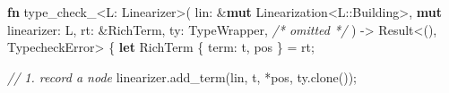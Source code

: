 \documentclass[
  a4paper,
  bibtex,
  english,
  nomenclature]{kthlatex/kththesis/kththesis}
\newenvironment{Shaded}{}{}
\newcommand{\CommentTok}[1]{\textcolor[rgb]{0.38,0.63,0.69}{\textit{#1}}}
\newcommand{\DataTypeTok}[1]{\textcolor[rgb]{0.56,0.13,0.00}{#1}}
\newcommand{\KeywordTok}[1]{\textcolor[rgb]{0.00,0.44,0.13}{\textbf{#1}}}
\newcommand{\NormalTok}[1]{#1}
\newcommand{\OperatorTok}[1]{\textcolor[rgb]{0.40,0.40,0.40}{#1}}
\newcommand{\PreprocessorTok}[1]{\textcolor[rgb]{0.74,0.48,0.00}{#1}}
\begin{document}
\begin{codelisting}

\caption{Abstract type checking function}

\hypertarget{lst:nickel-tc-abstract}{%
\label{lst:nickel-tc-abstract}}%
\begin{Shaded}
\begin{Highlighting}[]
\KeywordTok{fn}\NormalTok{ type\_check\_}\OperatorTok{\textless{}}\NormalTok{L}\OperatorTok{:}\NormalTok{ Linearizer}\OperatorTok{\textgreater{}}\NormalTok{(}
\NormalTok{    lin}\OperatorTok{:} \OperatorTok{\&}\KeywordTok{mut}\NormalTok{ Linearization}\OperatorTok{\textless{}}\PreprocessorTok{L::}\NormalTok{Building}\OperatorTok{\textgreater{},}
    \KeywordTok{mut}\NormalTok{ linearizer}\OperatorTok{:}\NormalTok{ L}\OperatorTok{,}
\NormalTok{    rt}\OperatorTok{:} \OperatorTok{\&}\NormalTok{RichTerm}\OperatorTok{,}
\NormalTok{    ty}\OperatorTok{:}\NormalTok{ TypeWrapper}\OperatorTok{,}
    \CommentTok{/* omitted */}
\NormalTok{) }\OperatorTok{{-}\textgreater{}} \DataTypeTok{Result}\OperatorTok{\textless{}}\NormalTok{()}\OperatorTok{,}\NormalTok{ TypecheckError}\OperatorTok{\textgreater{}} \OperatorTok{\{}
    \KeywordTok{let}\NormalTok{ RichTerm }\OperatorTok{\{}\NormalTok{ term}\OperatorTok{:}\NormalTok{ t}\OperatorTok{,}\NormalTok{ pos }\OperatorTok{\}} \OperatorTok{=}\NormalTok{ rt}\OperatorTok{;}

    \CommentTok{// 1. record a node}
\NormalTok{    linearizer}\OperatorTok{.}\NormalTok{add\_term(lin}\OperatorTok{,}\NormalTok{ t}\OperatorTok{,} \OperatorTok{*}\NormalTok{pos}\OperatorTok{,}\NormalTok{ ty}\OperatorTok{.}\NormalTok{clone())}\OperatorTok{;}


\end{Highlighting}
\end{Shaded}
\end{codelisting}
\end{document}
